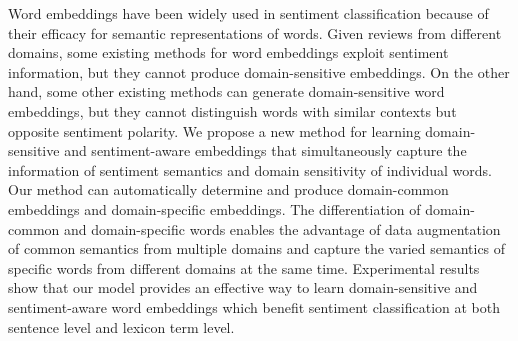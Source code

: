 Word embeddings have been widely used in sentiment classification because of their efficacy for semantic representations of words. Given reviews from different domains, some existing methods for word embeddings exploit sentiment information, but they cannot produce domain-sensitive embeddings. On the other hand, some other existing methods can generate domain-sensitive word embeddings, but they cannot distinguish words with similar contexts but opposite sentiment polarity. We propose a new method for learning domain-sensitive and sentiment-aware embeddings that simultaneously capture the information of sentiment semantics and domain sensitivity of individual words. Our method can automatically determine and produce domain-common embeddings and domain-specific embeddings. The differentiation of domain-common and domain-specific words enables the advantage of data augmentation of common semantics from multiple domains and capture the varied semantics of specific words from different domains at the same time. Experimental results show that our model provides an effective way to learn domain-sensitive and sentiment-aware word embeddings which benefit sentiment classification at both sentence level and lexicon term level.
